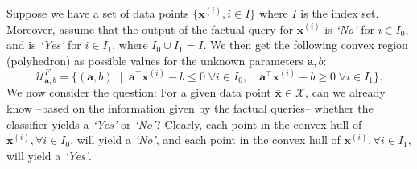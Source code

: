 \documentclass{article}
\begin{document}
Suppose we have a set of data points $\{\bm{x}^{(i)}, i\in I\}$ where $I$ is the index set. Moreover, assume that the output of the factual query for $\bm{x}^{(i)}$ is \textit{`No'} for $i\in I_{0}$, and is \textit{`Yes'} for $i\in I_1$, where $I_{0} \cup I_1 = I$. We then get the following convex region (polyhedron) as possible values for the unknown parameters $\bm{a},b$:
\begin{equation}\label{eq:Uncertainty_ab_F}
  \mathcal{U}_{\bm{a},b}^F = \{(\bm{a},b) \;\; | \; \;\bm{a}^{\top}\bm{x}^{(i)}-b \leq0  \;  \forall i \in I_{0}, \quad  \bm{a}^{\top}\bm{x}^{(i)} -b\geq 0 \;  \forall i \in I_1 \}.
\end{equation}
We now consider the question: For a given data point $\bar{\bm{x}}\in\mathcal{X}$, can we already know --based on the information given by the factual queries-- whether the classifier yields a \textit{`Yes'} or \textit{`No'}?
Clearly, each point in the convex hull of $\bm{x}^{(i)}, \forall i \in I_{0}$, will yield a \textit{`No'}, and each point in the convex hull of $\bm{x}^{(i)}, \forall i \in I_1$, will yield a \textit{`Yes'}. 
\end{document}
